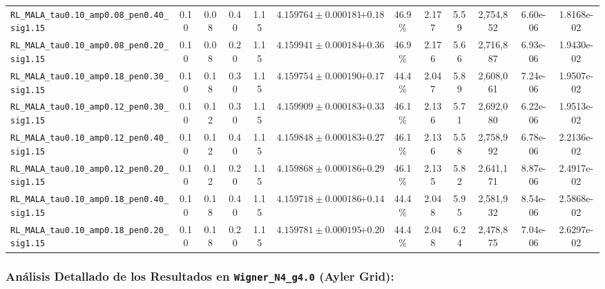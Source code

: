\documentclass[10pt,a4paper]{article}
\begin{document}
\begin{table}[H]
\begin{adjustbox}{max width=\textwidth}
\begin{tabular}{lcccccccccccc}
\texttt{RL\_MALA\_tau0.10\_amp0.08\_pen0.40\_sig1.15} & 0.10 & 0.08 & 0.40 & 1.15 & $4.159764 \pm 0.000181$ & $+0.18$ & 46.9\% & 2.177 & 5.59 & 2,754,852 & 6.60e-06 & 1.8168e-02 \\
\texttt{RL\_MALA\_tau0.10\_amp0.08\_pen0.20\_sig1.15} & 0.10 & 0.08 & 0.20 & 1.15 & $4.159941 \pm 0.000184$ & $+0.36$ & 46.9\% & 2.176 & 5.66 & 2,716,887 & 6.93e-06 & 1.9430e-02 \\
\texttt{RL\_MALA\_tau0.10\_amp0.18\_pen0.30\_sig1.15} & 0.10 & 0.18 & 0.30 & 1.15 & $4.159754 \pm 0.000190$ & $+0.17$ & 44.4\% & 2.047 & 5.89 & 2,608,061 & 7.24e-06 & 1.9507e-02 \\
\texttt{RL\_MALA\_tau0.10\_amp0.12\_pen0.30\_sig1.15} & 0.10 & 0.12 & 0.30 & 1.15 & $4.159909 \pm 0.000183$ & $+0.33$ & 46.1\% & 2.136 & 5.71 & 2,692,080 & 6.22e-06 & 1.9513e-02 \\
\texttt{RL\_MALA\_tau0.10\_amp0.12\_pen0.40\_sig1.15} & 0.10 & 0.12 & 0.40 & 1.15 & $4.159848 \pm 0.000183$ & $+0.27$ & 46.1\% & 2.136 & 5.58 & 2,758,992 & 6.78e-06 & 2.2136e-02 \\
\texttt{RL\_MALA\_tau0.10\_amp0.12\_pen0.20\_sig1.15} & 0.10 & 0.12 & 0.20 & 1.15 & $4.159868 \pm 0.000186$ & $+0.29$ & 46.1\% & 2.135 & 5.82 & 2,641,171 & 8.87e-06 & 2.4917e-02 \\
\texttt{RL\_MALA\_tau0.10\_amp0.18\_pen0.40\_sig1.15} & 0.10 & 0.18 & 0.40 & 1.15 & $4.159718 \pm 0.000186$ & $+0.14$ & 44.4\% & 2.048 & 5.95 & 2,581,932 & 8.54e-06 & 2.5868e-02 \\
\texttt{RL\_MALA\_tau0.10\_amp0.18\_pen0.20\_sig1.15} & 0.10 & 0.18 & 0.20 & 1.15 & $4.159781 \pm 0.000195$ & $+0.20$ & 44.4\% & 2.048 & 6.24 & 2,478,875 & 7.04e-06 & 2.6297e-02 \\
\bottomrule
\end{tabular}
\end{adjustbox}
\end{table}



\subsubsection{Análisis Detallado de los Resultados en \texttt{Wigner\_N4\_g4.0} (Ayler Grid):}
\end{document}
